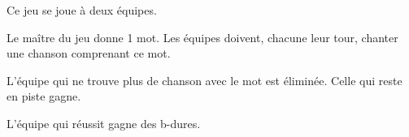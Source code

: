 \documentclass{grand-jeu}
\begin{document}
\begin{regles}
Ce jeu se joue à deux équipes.

Le maître du jeu donne 1 mot. Les équipes doivent, chacune leur tour, chanter une chanson comprenant ce mot.

L’équipe qui ne trouve plus de chanson avec le mot est éliminée. Celle qui reste en piste gagne.

L'équipe qui réussit gagne des b-dures. 
\end{regles}

\begin{imaginaire}


\end{imaginaire}

\begin{moments-stop}
\end{moments-stop}
\end{document}
